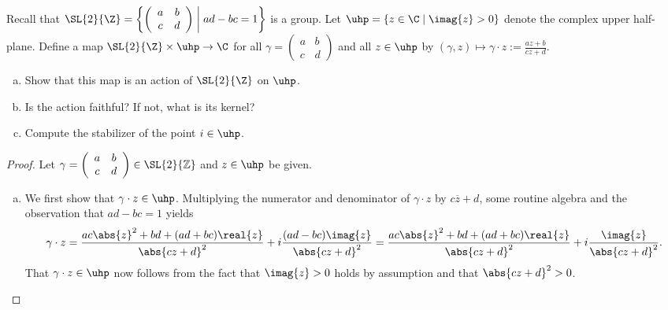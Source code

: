 \documentclass[10pt]{amsart}
\begin{document}
\begin{thm}
  Recall that $\SL{2}{\Z} = \displaystyle{\left\{ \left(\begin{array}{cc} a & b\\ c & d \end{array}\right) \;\middle\vert\; ad-bc=1\right\}}$ is a group.
  Let $\uhp = \left\{z \in \C \;\middle\vert\; \imag{z} > 0\right\}$ denote the complex upper half-plane.
  Define a map $\SL{2}{\Z} \times \uhp \rightarrow \C$ for all $\gamma =\left(\begin{array}{cc} a & b\\c & d\end{array}\right)$ and all $z \in \uhp$ by $(\gamma, z) \mapsto \gamma\cdot z := \displaystyle{\frac{az + b}{cz + d}}$.
    \begin{enumerate}[(a)]
    \item
      Show that this map is an action of $\SL{2}{\Z}$ on $\uhp$.
    \item
      Is the action faithful?  If not, what is its kernel?
    \item
      Compute the stabilizer of the point $i \in \uhp$.
    \end{enumerate}
  \begin{proof}
    Let $\gamma = \left(\begin{array}{cc} a & b\\c & d\end{array}\right) \in \SL{2}{\mathbb{Z}}$ and $z \in \uhp$ be given.
      \begin{enumerate}[(a)]
      \item
	We first show that $\gamma \cdot z \in \uhp$.
	Multiplying the numerator and denominator of $\gamma\cdot z$ by $c\overline{z} + d$, some routine algebra and the observation that $ad-bc = 1$ yields
	$$\gamma\cdot z = \frac{ac\abs{z}^2 + bd + (ad + bc)\real{z}}{\abs{cz+d}^2} + i\frac{(ad - bc)\imag{z}}{\abs{cz+d}^2} = \frac{ac\abs{z}^2 + bd + (ad + bc)\real{z}}{\abs{cz+d}^2} + i\frac{\imag{z}}{\abs{cz+d}^2}.$$
	That $\gamma\cdot z \in \uhp$ now follows from the fact that $\imag{z} > 0$ holds by assumption and that $\abs{cz+d}^2 > 0$.
	

\end{enumerate}
\end{proof}
\end{thm}
\end{document}
